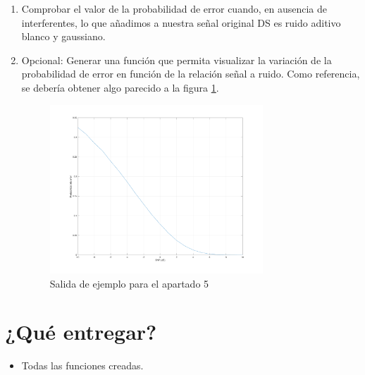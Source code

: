 \documentclass[es,practica]{uah}
\begin{document}
\begin{enumerate}
	\item Comprobar el valor de la probabilidad de error cuando, en ausencia de interferentes, lo que añadimos a nuestra señal original DS es ruido aditivo blanco y gaussiano.
	\item Opcional: Generar una función que permita visualizar la variación de la probabilidad de error en función de la relación señal a ruido. Como referencia, se debería obtener algo parecido a la figura \ref{fig:figura2}.
	
	\begin{figure}[h!]
		\centering\includegraphics[width=8cm]{../Apuntes/Figuras/Figura2}
		\caption{Salida de ejemplo para el apartado 5}
		\label{fig:figura2}
	\end{figure}

\end{enumerate}


\section{¿Qué entregar?}
\begin{itemize}
	\item Todas las funciones creadas.
\end{itemize}


\end{document}

